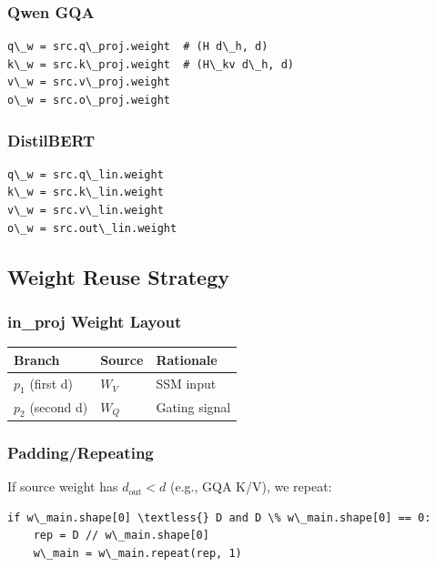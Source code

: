 \subsubsection{Qwen GQA}

\begin{lstlisting}
q\_w = src.q\_proj.weight  # (H d\_h, d)
k\_w = src.k\_proj.weight  # (H\_kv d\_h, d)
v\_w = src.v\_proj.weight
o\_w = src.o\_proj.weight
\end{lstlisting}

\subsubsection{DistilBERT}

\begin{lstlisting}
q\_w = src.q\_lin.weight
k\_w = src.k\_lin.weight
v\_w = src.v\_lin.weight
o\_w = src.out\_lin.weight
\end{lstlisting}

\subsection{Weight Reuse Strategy}

\subsubsection{in\_proj Weight Layout}

\begin{table}[H]
\centering
\small
\begin{tabular}{lll}
\toprule
\textbf{Branch} & \textbf{Source} & \textbf{Rationale} \\
\midrule
$p_1$ (first d) & $W_V$ & SSM input \\
$p_2$ (second d) & $W_Q$ & Gating signal \\
\bottomrule
\end{tabular}
\end{table}

\subsubsection{Padding/Repeating}

If source weight has $d_\text{out} < d$ (e.g., GQA K/V), we repeat:

\begin{lstlisting}
if w\_main.shape[0] \textless{} D and D \% w\_main.shape[0] == 0:
    rep = D // w\_main.shape[0]
    w\_main = w\_main.repeat(rep, 1)
\end{lstlisting}

